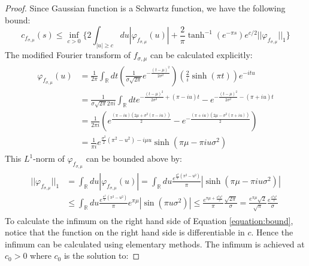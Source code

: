 \documentclass[a4paper,11pt]{article}
\theoremstyle{definition}
\newcommand{\lb}{\left(}
\newcommand{\rb}{\right)}
\begin{document}
\begin{proof}
    Since Gaussian function is a Schwartz function, we have the following bound:
    \begin{equation}\label{equation:bound}
        c_{f_{\sigma,\mu}}(s) \leq \inf_{c > 0}\{2\int_{|u|\geq c}du |\varphi_{f_{\sigma,\mu}}(u)| + \frac{2}{\pi}\tanh^{-1}(e^{-\pi s})e^{c/2}||\varphi_{f_{\sigma,\mu}}||_1\}
    \end{equation}
    The modified Fourier transform of $f_{\sigma,\mu}$ can be calculated explicitly:
    \begin{align}
        \begin{split}
            \varphi_{f_{\sigma,\mu}}(u) &= \frac{1}{2\pi}\int_\mathbb{R} dt \lb \frac{1}{\sigma\sqrt{2\pi}}e^{-\frac{(t - \mu)^2}{2\sigma^2}} \rb\lb \frac{2}{i}\sinh(\pi t) \rb e^{-it u}
            \\&
            =\frac{1}{\sigma\sqrt{2\pi }2\pi i}\int_\mathbb{R} dt e^{-\frac{(t-  \mu)^2}{2\sigma^2} + (\pi - i u) t} - e^{-\frac{(t - \mu)^2}{2\sigma^2} - (\pi + i u) t}
            \\&
            =\frac{1}{2\pi i}\lb e^{\frac{(\pi - iu)(2\mu + \sigma^2(\pi - iu))}{2}} - e^{-\frac{(\pi + iu)(2\mu - \sigma^2(\pi + iu))}{2}}\rb
            \\&
            =\frac{1}{\pi i}e^{\frac{\sigma^2}{2}(\pi^2 - u^2) - i\mu u}\sinh(\pi \mu  - \pi i u\sigma^2)
        \end{split}
    \end{align}
    This $L^1$-norm of $\varphi_{f_{\sigma,\mu}}$ can be bounded above by:
    \begin{align}
        \begin{split}
            ||\varphi_{f_{\sigma,\mu}}||_1 &= \int_\mathbb{R} du |\varphi_{f_{\sigma,\mu}}(u)| = \int_\mathbb{R} du \frac{e^{\frac{\sigma^2}{2}(\pi^2 - u^2)}}{\pi}|\sinh(\pi\mu - \pi i u \sigma^2)|
            \\&
            \leq \int_\mathbb{R}du\frac{e^{\frac{\sigma^2}{2}(\pi^2 - u^2)}}{\pi}e^{\pi\mu}|\sin(\pi u \sigma^2)|\leq \frac{e^{\pi\mu + \frac{\sigma^2\pi^2}{2}}}{\pi}\frac{\sqrt{2\pi}}{\sigma} = \frac{e^{\pi\mu}\sqrt{2}}{\sqrt{\pi}}\frac{e^{\frac{\sigma^2\pi^2}{2}}}{\sigma}
        \end{split}
    \end{align}
    To calculate the infimum on the right hand side of Equation \ref{equation:bound}, notice that the function on the right hand side is differentiable in $c$. Hence the infimum can be calculated using elementary methods. The infimum is achieved at $c_0 > 0$ where $c_0$ is the solution to:

\end{proof}
\end{document}
